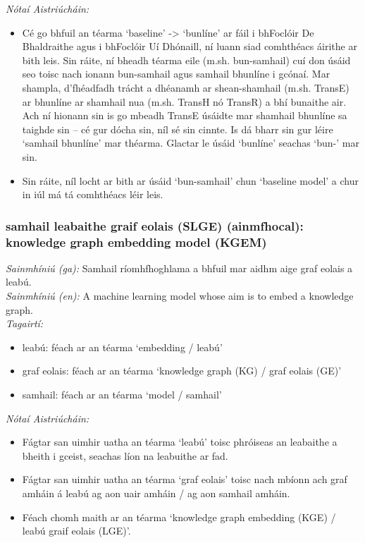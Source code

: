  \noindent \textit{Nótaí Aistriúcháin:}
\begin{itemize}
	\item Cé go bhfuil an téarma `baseline' -> `bunlíne' ar fáil i bhFoclóir De Bhaldraithe agus i bhFoclóir Uí Dhónaill, ní luann siad comhthéacs áirithe ar bith leis. Sin ráite, ní bheadh téarma eile (m.sh. bun-samhail) cuí don úsáid seo toisc nach ionann bun-samhail agus samhail bhunlíne i gcónaí. Mar shampla, d'fhéadfadh trácht a dhéanamh ar shean-shamhail (m.sh. TransE) ar bhunlíne ar shamhail nua (m.sh. TransH nó TransR) a bhí bunaithe air. Ach ní hionann sin is go mbeadh TransE úsáidte mar shamhail bhunlíne sa taighde sin -- cé gur dócha sin, níl sé sin cinnte. Is dá bharr sin gur léire `samhail bhunlíne' mar théarma. Glactar le úsáid `bunlíne' seachas `bun-' mar sin.
	\item Sin ráite, níl locht ar bith ar úsáid `bun-samhail' chun `baseline model' a chur in iúl má tá comhthéacs léir leis.
\end{itemize}


\subsubsection*{samhail leabaithe graif eolais (SLGE) (ainmfhocal): knowledge graph embedding model (KGEM)}
 \noindent \textit{Sainmhíniú (ga):} Samhail ríomhfhoghlama a bhfuil mar aidhm aige graf eolais a leabú.
\\
 \noindent \textit{Sainmhíniú (en):} A machine learning model whose aim is to embed a knowledge graph.
\\
 \noindent \textit{Tagairtí:}
\begin{itemize}
	\item leabú: féach ar an téarma `embedding / leabú'
	\item graf eolais: féach ar an téarma `knowledge graph (KG) / graf eolais (GE)'
	\item samhail: féach ar an téarma `model / samhail'
\end{itemize}

 \noindent \textit{Nótaí Aistriúcháin:}
\begin{itemize}
	\item Fágtar san uimhir uatha an téarma `leabú' toisc phróiseas an leabaithe a bheith i gceist, seachas líon na leabuithe ar fad.
	\item Fágtar san uimhir uatha an téarma `graf eolais' toisc nach mbíonn ach graf amháin á leabú ag aon uair amháin / ag aon samhail amháin.
	\item Féach chomh maith ar an téarma `knowledge graph embedding (KGE) / leabú graif eolais (LGE)'.
\end{itemize}


